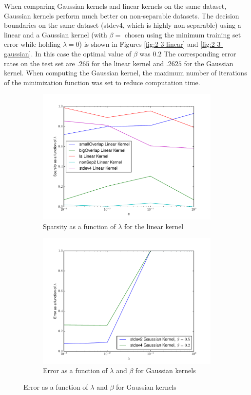 \documentclass[10pt]{article}
\begin{document}
When comparing Gaussian kernels and linear kernels on the same dataset, Gaussian kernels perform much better on non-separable datasets. The decision boundaries on the same dataset (stdev4, which is highly non-separable) using a linear and a Gaussian kernel (with $\beta = $ chosen using the minimum training set error while holding $\lambda = 0$) is shown in Figures \ref{fig:2-3-linear} and \ref{fig:2-3-gaussian}. In this case the optimal value of $\beta$ was $0.2$ The corresponding error rates on the test set are $.265$ for the linear kernel and $.2625$ for the Gaussian kernel. When computing the Gaussian kernel, the maximum number of iterations of the minimization function was set to reduce computation time.

\begin{figure}[!ht]
\begin{subfigure}[b]{0.46\textwidth}
	\centering
	\includegraphics[width=\textwidth]{exercise2-2.pdf}
	\caption{Sparsity as a function of $\lambda$ for the linear kernel}
	\label{fig:2-2}
\end{subfigure}
\begin{subfigure}[b]{0.46\textwidth}
	\centering
	\includegraphics[width=\textwidth]{exercise2-4.pdf}
	\caption{Error as a function of $\lambda$ and $\beta$ for Gaussian kernels}
	\label{fig:2-4}
\end{subfigure}
\end{figure}
\end{document}
